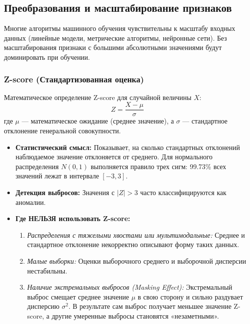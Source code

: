 \documentclass[12pt]{article}
\begin{document}
\newpage

\subsection{Преобразования и масштабирование признаков}

Многие алгоритмы машинного обучения чувствительны к масштабу входных данных (линейные модели, метрические алгоритмы, нейронные сети). Без масштабирования признаки с большими абсолютными значениями будут доминировать при обучении.

\subsubsection{Z-score (Стандартизованная оценка)}

Математическое определение Z-score для случайной величины $X$:
\begin{equation}
    Z = \frac{X - \mu}{\sigma}
\end{equation}
где $\mu$ --- математическое ожидание (среднее значение), а $\sigma$ --- стандартное отклонение генеральной совокупности.

\begin{itemize}
    \item \textbf{Статистический смысл:} Показывает, на сколько стандартных отклонений наблюдаемое значение отклоняется от среднего. Для нормального распределения $N(0, 1)$ выполняется правило трех сигм: 99.73\% всех значений лежат в интервале $[-3, 3]$.
    \item \textbf{Детекция выбросов:} Значения с $|Z| > 3$ часто классифицируются как аномалии.
    \item \textbf{Где НЕЛЬЗЯ использовать Z-score:}
    \begin{enumerate}
        \item \textit{Распределения с тяжелыми хвостами или мультимодальные:} Среднее и стандартное отклонение некорректно описывают форму таких данных.
        \item \textit{Малые выборки:} Оценки выборочного среднего и выборочной дисперсии нестабильны.
        \item \textit{Наличие экстремальных выбросов (Masking Effect):} Экстремальный выброс смещает среднее значение $\mu$ в свою сторону и сильно раздувает дисперсию $\sigma^2$. В результате сам выброс получает меньшее значение Z-score, а другие умеренные выбросы становятся «незаметными».
    \end{enumerate}
\end{itemize}
\end{document}
